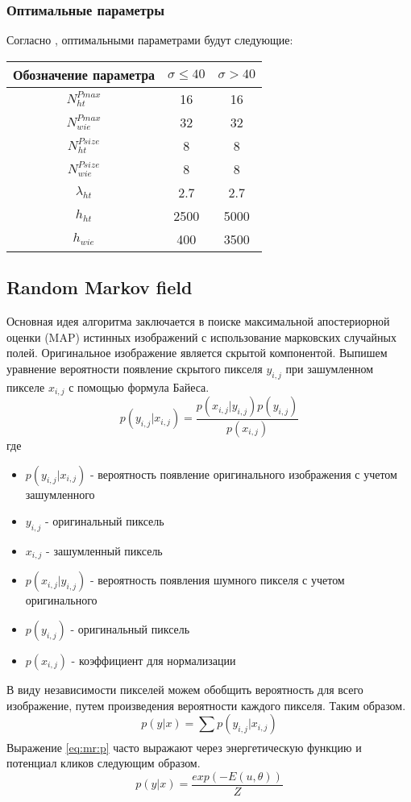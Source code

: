 \subsubsection{Оптимальные параметры}
Согласно \cite{bm3d}, оптимальными параметрами будут следующие:

\begin{tabular}{|c|c|c|}
	\hline
	Обозначение параметра & $\sigma \leq 40$ & $\sigma > 40$\\
	\hline
	$N_{ht}^{Pmax}$ & 16 & 16 \\
	\hline
	$N_{wie}^{Pmax}$ & 32 & 32 \\
	\hline
	$N_{ht}^{Psize}$ & 8 & 8 \\
	\hline
	$N_{wie}^{Psize}$ & 8 & 8 \\
	\hline
	$\lambda_{ht}$ & 2.7 & 2.7 \\
	\hline
	$h_{ht}$ & 2500 & 5000 \\
	\hline
	$h_{wie}$ & 400 & 3500 \\ 
	\hline
	
\end{tabular}

\subsection{Random Markov field}
Основная идея алгоритма заключается в поиске  максимальной апостериорной оценки (MAP) истинных изображений с использование марковских случайных полей.
Оригинальное изображение является скрытой компонентой.
Выпишем уравнение вероятности появление скрытого пикселя $y_{i,j}$ при зашумленном пикселе $x_{i,j}$ с помощью формула Байеса.
\begin{equation}\label{eq:mr:p}
	p(y_{i,j}|x_{i,j}) = \frac{p(x_{i,j}|y_{i,j})p(y_{i,j})}{p(x_{i,j})}
\end{equation}
где
\begin{itemize}
	\item $p(y_{i,j}|x_{i,j})$ - вероятность появление оригинального изображения с учетом зашумленного
	\item $y_{i,j}$ -  оригинальный пиксель
	\item $x_{i,j}$ -  зашумленный пиксель
	\item $p(x_{i,j}|y_{i,j})$ - вероятность появления шумного пикселя с учетом оригинального
	\item $p(y_{i,j})$ - оригинальный пиксель
	\item $p(x_{i,j})$ - коэффициент для нормализации
\end{itemize}
В виду независимости пикселей можем обобщить вероятность для всего изображение, путем произведения вероятности каждого пикселя. Таким образом.
\begin{equation}
	p(y|x) = \sum_{}^{}p(y_{i,j}|x_{i,j})
\end{equation}
Выражение  \ref{eq:mr:p} часто выражают через энергетическую функцию и потенциал кликов следующим образом.
\begin{equation}\label{eq:mr:en}
p(y|x)=\frac{exp(-E(u,\theta))}{Z}
\end{equation}


